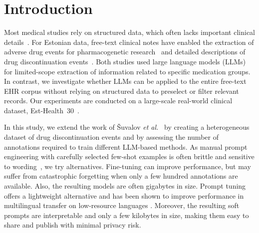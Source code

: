 \section{Introduction}

Most medical studies rely on structured data, which often lacks
important clinical details~\cite{kho2011,Seinen2025}. For Estonian
data, free-text clinical notes have enabled the extraction of adverse
drug events for pharmacogenetic research~\cite{sarg2025} and detailed
descriptions of drug discontinuation
events~\cite{suvalov-2026-extract}. Both studies used large language
models (LLMs) for limited-scope extraction of information related to
specific medication groups. In contrast, we investigate whether LLMs
can be applied to the entire free-text EHR corpus without relying on
structured data to preselect or filter relevant records. Our
experiments are conducted on a large-scale real-world clinical
dataset, Est-Health~30~\cite{reisberg2026eh30}.

In this study, we extend the work of \v{S}uvalov \emph{et
al.}~\cite{suvalov-2026-extract} by creating a heterogeneous dataset
of drug discontinuation events and by assessing the number of
annotations required to train different LLM-based methods. As manual
prompt engineering with carefully selected few-shot examples is often
brittle and sensitive to wording~\cite{brown2020language,liu2024gpt},
we try alternatives. Fine-tuning can improve performance, but may
suffer from catastrophic forgetting when only a few hundred
annotations are available. Also, the resulting models are often
gigabytes in size. Prompt tuning offers a lightweight alternative and
has been shown to improve performance in multilingual transfer on
low-resource languages
\cite{philippy-etal-2024-soft,lester2021power}. Moreover, the
resulting soft prompts are interpretable and only a few kilobytes in
size, making them easy to share and publish with minimal privacy risk.
